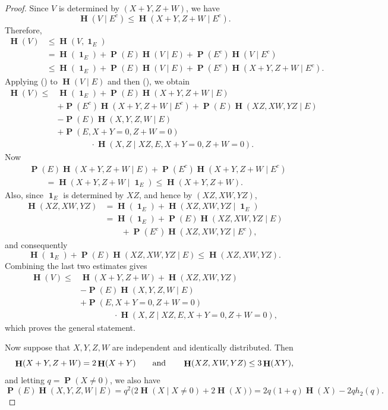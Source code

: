\documentclass[twoside, 10pt]{article}
\renewcommand{\eqref}[1]{\textup{{\normalfont(\oldstylenums{\ref{#1}}}\normalfont)}}
\DeclareMathOperator{\Eta}{\mathbf{H}}
\DeclareMathOperator{\pr}{\mathbf{P}}
\newcommand\given{\mathbin{|}}
\newcommand{\one}{\mathop{\mathbf{1}}\nolimits}
\begin{document}
\begin{proof}
Since $V$ is determined by $(X+Y,Z+W)$, we have
\[
\Eta(V\given E^c)
\le
\Eta(X+Y,Z+W\given E^c).
\]
Therefore,
\begin{align*}
\Eta(V)
&\le \Eta(V,\one_E)\\
&=\Eta(\one_E)
  +\pr(E)\Eta(V\given E)
  +\pr(E^c)\Eta(V\given E^c)\\
&\le \Eta(\one_E)
  +\pr(E)\Eta(V\given E)
  +\pr(E^c)\Eta(X+Y,Z+W\given E^c).
\end{align*}
Applying \eqref{HVgivEbound} to $\Eta(V\given E)$ and then \eqref{Hofalot}, we obtain
\begin{align*}
\Eta(V)\le{}&
\Eta(\one_E)
+\pr(E)\Eta(X+Y,Z+W\given E)\\
&+\pr(E^c)\Eta(X+Y,Z+W\given E^c)
+\pr(E)\Eta(XZ,XW,YZ\given E)\\
&-\pr(E)\Eta(X,Y,Z,W\given E)\\
&+\pr(E,X+Y=0,Z+W=0)\\
&\qquad\qquad\cdot
\Eta(X,Z\given XZ,E,X+Y=0,Z+W=0).
\end{align*}
Now
\begin{align*}
&\pr(E)\Eta(X+Y,Z+W\given E)
+\pr(E^c)\Eta(X+Y,Z+W\given E^c)\\
&\qquad=
\Eta(X+Y,Z+W\given\one_E)
\le
\Eta(X+Y,Z+W).
\end{align*}
Also, since $\one_E$ is determined by $XZ$, and hence by
$(XZ,XW,YZ)$,
\begin{align*}
\Eta(XZ,XW,YZ)
&=\Eta(\one_E)+\Eta(XZ,XW,YZ\given\one_E)\\
&=\Eta(\one_E)
+\pr(E)\Eta(XZ,XW,YZ\given E)\\
&\qquad
+\pr(E^c)\Eta(XZ,XW,YZ\given E^c),
\end{align*}
and consequently
\[
\Eta(\one_E)
+\pr(E)\Eta(XZ,XW,YZ\given E)
\le
\Eta(XZ,XW,YZ).
\]
Combining the last two estimates gives
\begin{align*}
\Eta(V)\le{}&
\Eta(X+Y,Z+W)+\Eta(XZ,XW,YZ)\\
&-\pr(E)\Eta(X,Y,Z,W\given E)\\
&+\pr(E,X+Y=0,Z+W=0)\\
&\qquad\qquad\cdot
\Eta(X,Z\given XZ,E,X+Y=0,Z+W=0),
\end{align*}
which proves the general statement.


Now suppose that $X,Y,Z,W$ are independent and identically distributed.
Then
\[
\Eta(X+Y,Z+W)=2\Eta(X+Y)
\qquad\hbox{and}\qquad
\Eta(XZ,XW,YZ)\le3\Eta(XY),
\]
and letting $q = \pr(X\ne 0)$, we also have
\[
\pr(E)\Eta(X,Y,Z,W\given E)
=
q^2
\bigl(2\Eta(X\given X\ne0)+2\Eta(X)\bigr)
=
2q(1+q)\Eta(X)
-2qh_2(q).
\]


\end{proof}
\end{document}
